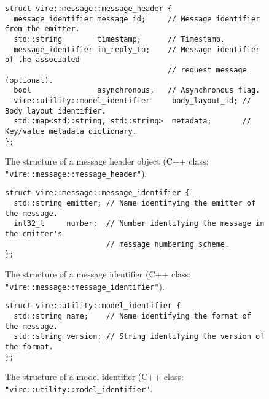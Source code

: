 \begin{figure}[h]
\vskip 10pt
\small
\begin{Verbatim}[frame=single,xleftmargin=0.cm,label=\fbox{C++}]
struct vire::message::message_header {
  message_identifier message_id;     // Message identifier from the emitter.
  std::string        timestamp;      // Timestamp.
  message_identifier in_reply_to;    // Message identifier of the associated
                                     // request message (optional).
  bool               asynchronous,   // Asynchronous flag.
  vire::utility::model_identifier     body_layout_id; // Body layout identifier.
  std::map<std::string, std::string>  metadata;       // Key/value metadata dictionary.
};
\end{Verbatim}
\normalsize
\caption{The  structure  of  a   message  header  object  (C++  class:
  \texttt{"vire::message::message\_header"}).}\label{fig-vire-message-message_header-cpp}
\end{figure}

\begin{figure}[h]
\vskip 10pt
\small
\begin{Verbatim}[frame=single,xleftmargin=0.cm,label=\fbox{C++}]
struct vire::message::message_identifier {
  std::string emitter; // Name identifying the emitter of the message.
  int32_t     number;  // Number identifying the message in the emitter's
                       // message numbering scheme.
};
\end{Verbatim}
\normalsize
\caption{The      structure      of     a      message      identifier
  (C++  class:  \texttt{"vire::message::message\_identifier"}).}
\label{fig-vire-message-message_identifier-cpp}
\end{figure}

\begin{figure}[h]
\vskip 10pt
\small
\begin{Verbatim}[frame=single,xleftmargin=0.cm,label=\fbox{C++}]
struct vire::utility::model_identifier {
  std::string name;    // Name identifying the format of the message.
  std::string version; // String identifying the version of the format.
};
\end{Verbatim}
\normalsize
\caption{The structure of a model identifier (C++  class:  \texttt{"vire::utility::model\_identifier"}.}\label{fig-vire-utility-model_identifier-cpp}
\end{figure}




